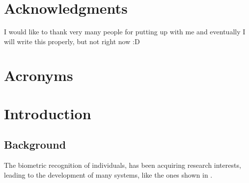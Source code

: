 \documentclass[titlepage,12pt,a4paper,times]{book}
\begin{document}


\clearpage{\thispagestyle{empty}\cleardoublepage}

\frontmatter
\chapter*{Acknowledgments}
\label{chap:ack}

I would like to thank very many people for putting up with me and eventually I
will write this properly, but not right now :D

\tableofcontents

\clearpage{\thispagestyle{empty}\cleardoublepage}

\listoffigures

\clearpage{\thispagestyle{empty}\cleardoublepage}

\listoftables
\clearpage{\thispagestyle{empty}\cleardoublepage}


\chapter*{Acronyms}
\begin{acronym}[SIFT]
\end{acronym}

% 

\clearpage{\thispagestyle{empty}\cleardoublepage}

\mainmatter
\chapter{Introduction}
\label{chap:intro}
\nocite{*}
\section{Background}
\label{sec:amb}

The biometric recognition of individuals, has been acquiring research
interests, leading to the development of many systems, like the ones shown in
\citep{14, 15}. 
\end{document}
